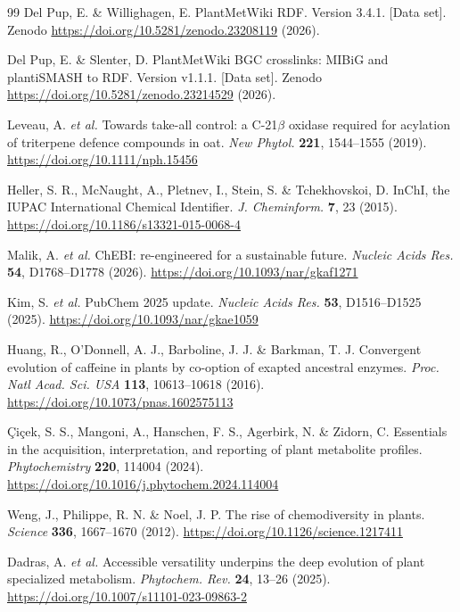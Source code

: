 \documentclass[11pt,a4paper]{article}
\begin{document}
\begin{thebibliography}{99}
Del Pup, E. \& Willighagen, E. PlantMetWiki RDF. Version 3.4.1. [Data set]. Zenodo \url{https://doi.org/10.5281/zenodo.23208119} (2026).

Del Pup, E. \& Slenter, D. PlantMetWiki BGC crosslinks: MIBiG and plantiSMASH to RDF. Version v1.1.1. [Data set]. Zenodo \url{https://doi.org/10.5281/zenodo.23214529} (2026).

Leveau, A. \textit{et al.} Towards take-all control: a C-21$\beta$ oxidase required for acylation of triterpene defence compounds in oat. \textit{New Phytol.} \textbf{221}, 1544--1555 (2019). \url{https://doi.org/10.1111/nph.15456}

Heller, S. R., McNaught, A., Pletnev, I., Stein, S. \& Tchekhovskoi, D. InChI, the IUPAC International Chemical Identifier. \textit{J. Cheminform.} \textbf{7}, 23 (2015). \url{https://doi.org/10.1186/s13321-015-0068-4}

Malik, A. \textit{et al.} ChEBI: re-engineered for a sustainable future. \textit{Nucleic Acids Res.} \textbf{54}, D1768--D1778 (2026). \url{https://doi.org/10.1093/nar/gkaf1271}

Kim, S. \textit{et al.} PubChem 2025 update. \textit{Nucleic Acids Res.} \textbf{53}, D1516--D1525 (2025). \url{https://doi.org/10.1093/nar/gkae1059}

Huang, R., O'Donnell, A. J., Barboline, J. J. \& Barkman, T. J. Convergent evolution of caffeine in plants by co-option of exapted ancestral enzymes. \textit{Proc. Natl Acad. Sci. USA} \textbf{113}, 10613--10618 (2016). \url{https://doi.org/10.1073/pnas.1602575113}

\c Ci\c cek, S. S., Mangoni, A., Hanschen, F. S., Agerbirk, N. \& Zidorn, C. Essentials in the acquisition, interpretation, and reporting of plant metabolite profiles. \textit{Phytochemistry} \textbf{220}, 114004 (2024). \url{https://doi.org/10.1016/j.phytochem.2024.114004}

Weng, J., Philippe, R. N. \& Noel, J. P. The rise of chemodiversity in plants. \textit{Science} \textbf{336}, 1667--1670 (2012). \url{https://doi.org/10.1126/science.1217411}

Dadras, A. \textit{et al.} Accessible versatility underpins the deep evolution of plant specialized metabolism. \textit{Phytochem. Rev.} \textbf{24}, 13--26 (2025). \url{https://doi.org/10.1007/s11101-023-09863-2}


\end{thebibliography}
\end{document}

